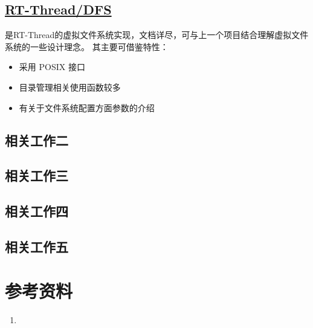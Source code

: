 \documentclass[a4paper]{article}
\begin{document}
\subsection{\href{https://www.rt-thread.org/document/site/\#/rt-thread-version/rt-thread-standard/programming-manual/filesystem/filesystem}{RT-Thread/DFS}}
是RT-Thread的虚拟文件系统实现，文档详尽，可与上一个项目结合理解虚拟文件系统的一些设计理念。
其主要可借鉴特性：
\begin{itemize}
    \item 采用 POSIX 接口
    \item 目录管理相关使用函数较多
    \item 有关于文件系统配置方面参数的介绍
\end{itemize}

\subsection{相关工作二}
\subsection{相关工作三}
\subsection{相关工作四}
\subsection{相关工作五}

\section{参考资料}
\begin{enumerate}
    \item 
    
\end{enumerate}
\end{document}
